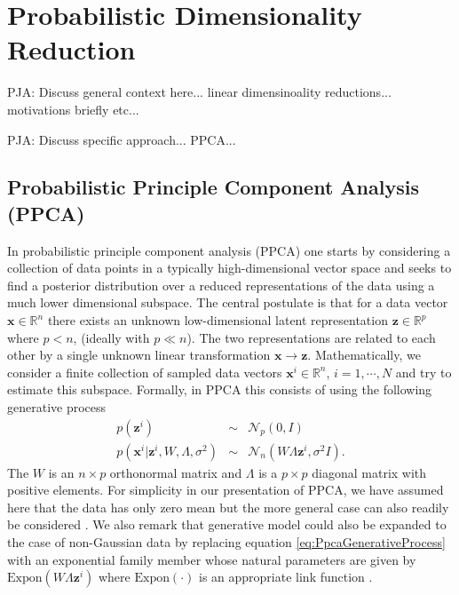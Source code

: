 \documentclass{article}
\newcommand{\commentPJA}[1]{{\textcolor{commentPJA_color}{PJA: #1}}}
\newcommand{\mb}[1]{\mathbf{#1}}
\begin{document}


\section{Probabilistic Dimensionality Reduction} \label{Probabilistic dimensionality reduction}

\commentPJA{Discuss general context here... linear dimensinoality reductions... motivations briefly etc...}

\commentPJA{Discuss specific approach... PPCA...}

\subsection{Probabilistic Principle Component Analysis (PPCA)}
In probabilistic principle component analysis (PPCA) one starts by considering a collection of data points in a typically high-dimensional vector space and seeks to find a posterior distribution over a reduced representations of the data using a much lower dimensional subspace.  The central postulate is that for a data vector $\mathbf{x} \in \mathbb{R}^n$ there exists an unknown low-dimensional latent representation $\mathbf{z} \in \mathbb{R}^p$ where $p < n$, (ideally with $p \ll n$).  The two representations are related to each other by a single unknown linear transformation $\mathbf{x} \rightarrow \mathbf{z}$.  Mathematically, we consider a finite collection of sampled data vectors $\mathbf{x}^i \in \mathbb{R}^n$, $i = 1, \cdots, N$ and try to estimate this subspace.  Formally, in PPCA this consists of using the following generative process
\begin{eqnarray}
\label{eq:PpcaGenerativeProcess}
p(\mb{z}^i) &\sim& \mathcal{N}_p(0, I) \nonumber\\
p(\mb{x}^i | \mb{z}^i, W, \Lambda, \sigma^2) &\sim& \mathcal{N}_n(W \Lambda \mb{z}^i, \sigma^2 I).
\end{eqnarray}
The $W$ is an $n \times p$ orthonormal matrix and $\Lambda$ is a $p \times p$ diagonal matrix with positive elements.  For simplicity in our presentation of PPCA, we have assumed here that the data has only zero mean but the more general case can also readily be considered \citep[chapt.~12.1]{murphy2012machine}. We also remark that generative model could also be expanded to the case of non-Gaussian data by replacing equation \ref{eq:PpcaGenerativeProcess} with an exponential family member whose natural parameters are given by $\mathrm{Expon}(W\Lambda \mb{z}^i)$ where $\mathrm{Expon}(\cdot)$ is an appropriate link function \citep{mohamed2009bayesian}. 
\end{document}
